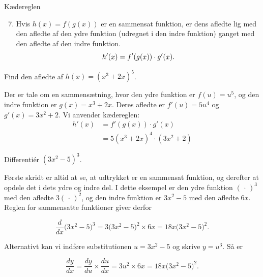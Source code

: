 \begin{theorem}{Kædereglen}
    \vspace{0.5em}
    \begin{enumerate}
        \setcounter{enumi}{6}
        \item Hvis \( h(x) = f(g(x)) \) er en sammensat funktion, er dens afledte lig med den afledte af den ydre funktion (udregnet i den indre funktion) ganget med den afledte af den indre funktion. \vspace{0.5em}
        \[
        h'(x) = f'(g(x)) \cdot g'(x). \vspace{0.5em}
        \]
    \end{enumerate}
\end{theorem}

\begin{example}

Find den afledte af \( h(x) = (x^3 + 2x)^5 \).
\end{example}

\begin{solution}
Der er tale om en sammensætning, hvor den ydre funktion er \( f(u) = u^5 \), og den indre funktion er \( g(x) = x^3 + 2x \). Deres afledte er \( f'(u) = 5u^4 \) og \( g'(x) = 3x^2 + 2 \).
Vi anvender kædereglen:
\[
\begin{aligned}
h'(x) &= f'(g(x)) \cdot g'(x) \\
&= 5(x^3 + 2x)^4 \cdot (3x^2 + 2)
\end{aligned}
\]
\end{solution}

\begin{example}

    Differentiér \(\left(3 x^2-5\right)^3\).
\end{example}

\begin{solution}
    Første skridt er altid at se, at udtrykket er en sammensat funktion, og derefter at opdele det i dets ydre og indre del. I dette eksempel er den ydre funktion $(\,\cdot\,)^{3}$ med den afledte $3(\,\cdot\,)^{2}$, og den indre funktion er $3x^{2}-5$ med den afledte $6x$. Reglen for sammensatte funktioner giver derfor

    \[
    \frac{d}{dx}\big(3x^{2}-5\big)^{3}
    = 3\big(3x^{2}-5\big)^{2} \times 6x
    = 18x\big(3x^{2}-5\big)^{2}.
    \]
    
    Alternativt kan vi indføre substitutionen \(u = 3x^{2}-5\) og skrive \(y = u^{3}\). Så er
    
    \[
    \frac{dy}{dx}
    = \frac{dy}{du} \times \frac{du}{dx}
    = 3u^{2} \times 6x
    = 18x\big(3x^{2}-5\big)^{2}.
    \]
    
\end{solution}

